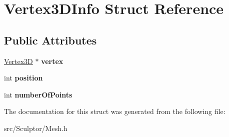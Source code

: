 \hypertarget{struct_vertex3_d_info}{
\section{\-Vertex3\-D\-Info \-Struct \-Reference}
\label{struct_vertex3_d_info}
}
\subsection*{\-Public \-Attributes}
\begin{DoxyCompactItemize}
\item 
\hypertarget{struct_vertex3_d_info_a1a5ca2aadc5d5fbdaf9f64f93be39056}{
\hyperlink{struct_vertex3_d}{\-Vertex3\-D} $\ast$ {\bfseries vertex}}
\label{struct_vertex3_d_info_a1a5ca2aadc5d5fbdaf9f64f93be39056}

\item 
\hypertarget{struct_vertex3_d_info_a8ab0d36b306ce1548cd732a450efd726}{
int {\bfseries position}}
\label{struct_vertex3_d_info_a8ab0d36b306ce1548cd732a450efd726}

\item 
\hypertarget{struct_vertex3_d_info_a4761572cab4590d39d2d2abccc6fb4cb}{
int {\bfseries number\-Of\-Points}}
\label{struct_vertex3_d_info_a4761572cab4590d39d2d2abccc6fb4cb}

\end{DoxyCompactItemize}


\-The documentation for this struct was generated from the following file\-:\begin{DoxyCompactItemize}
\item 
src/\-Sculptor/\-Mesh.\-h\end{DoxyCompactItemize}
